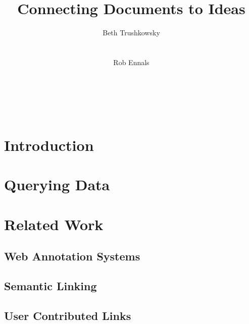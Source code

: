 \documentclass{sig-alternate_nocop}
\begin{document}
%
\title{Connecting Documents to Ideas}


\author{
\alignauthor Beth Trushkowsky\\
       \\
       \\
\alignauthor Rob Ennals\\
       \\
       \\
       \\
       \\
}

\sloppy 

\maketitle

\begin{abstract}



\end{abstract}

\section{Introduction}

\section{Querying Data}

\section{Related Work}

\subsection{Web Annotation Systems}

\subsection{Semantic Linking}

\subsection{User Contributed Links}
\end{document}
